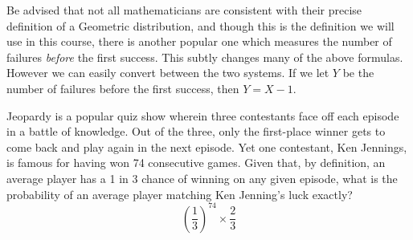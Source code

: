 \documentclass{report}
\begin{document}
    Be advised that not all mathematicians are consistent with their precise definition of a Geometric distribution, and though this is the definition we will use in this course, there is another popular one which measures the number of failures \emph{before} the first success. This subtly changes many of the above formulas. However we can easily convert between the two systems. If we let $Y$ be the number of failures before the first success, then $Y=X-1$.
    \begin{example}
        Jeopardy is a popular quiz show wherein three contestants face off each episode in a battle of knowledge. Out of the three, only the first-place winner gets to come back and play again in the next episode. Yet one contestant, Ken Jennings, is famous for having won 74 consecutive games. Given that, by definition, an average player has a 1 in 3 chance of winning on any given episode, what is the probability of an average player matching Ken Jenning's luck exactly?
        \solution
        \[
            \left(\frac 1 3\right)^{74}\times \frac 2 3
        \]
    \end{example}
\end{document}
